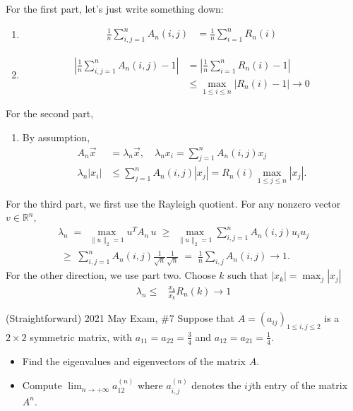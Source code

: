 \documentclass[../main]{subfiles}
\begin{document}
\begin{solution}
    For the first part, let's just write something down:
    \begin{enumerate}
        \item 
        \begin{align*}
        \frac{1}{n} \sum_{i,j=1}^n A_n(i,j) &= \frac{1}{n} \sum_{i=1}^n R_n(i)
    \end{align*}
        \item \begin{align*}
        \left|\frac{1}{n} \sum_{i,j=1}^n A_n(i,j) - 1\right| &= \left|\frac{1}{n} \sum_{i=1}^n R_n(i) - 1\right|\\
        &\leq \max_{1\leq i\leq n} |R_n(i) - 1| \to 0
    \end{align*}
    \end{enumerate}
    
    For the second part, 
    \begin{enumerate}
        \item By assumption, \begin{align*}
        A_n \vec x &= \lambda_n \vec x, \quad \lambda_n x_i = \sum_{j=1}^n A_n(i,j)x_j\\
        \lambda_n |x_i|&\leq \sum_{j=1}^n A_n(i,j)|x_j| = R_n(i) \max_{1\leq j \leq n} |x_j|.
    \end{align*}
    \end{enumerate}
    
    For the third part, we first use the Rayleigh quotient. For any nonzero vector $v\in\mathbb R^n$,
    \begin{align*}
      \lambda_n \;=\;\max_{\|u\|_2=1}u^T A_n\,u
      \;\ge\;
      \max_{\|u\|_2=1} \sum_{i,j=1}^n A_n(i,j)u_i u_j\\
      \;\geq\;\sum_{i,j=1}^n A_n(i,j)\frac{1}{\sqrt{n}}\frac{1}{\sqrt{n}}
      \;=\;
      \frac1n\sum_{i,j}A_n(i,j) \to 1.
    \end{align*}
    For the other direction, we use part two. Choose $k$ such that $|x_k| = \max_{j} |x_j|$
    \begin{align*}
        \lambda_n \leq &\frac{x_k}{x_k} R_n(k) \to 1
    \end{align*}
\end{solution}
\begin{bbox}{(Straightforward) {2021 May Exam, \#7}}
    Suppose that $A=(a_{ij})_{1\le i,j \le 2}$ is a $2\times 2$ symmetric matrix, with $a_{11} = a_{22} =\frac{3}{4}$ and $a_{12} = a_{21} = \frac{1}{4}$. 
    \begin{itemize}
        \item Find the eigenvalues and eigenvectors of the matrix $A$.
        \item Compute $\lim_{n\to +\infty} a_{12}^{(n)}$ where $a_{i,j}^{(n)}$ denotes the $ij$th entry of the matrix $A^n$.
    \end{itemize}
\end{bbox}
\end{document}
